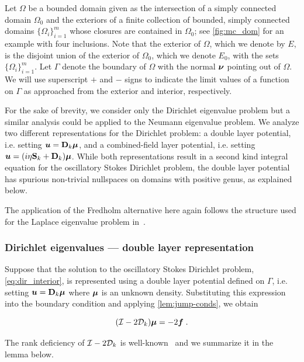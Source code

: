 Let $\Omega$ be a bounded domain given as
the intersection of a simply connected domain $\Omega_0$ and
the exteriors of a finite collection of bounded,
simply connected domains $\{ \Omega_i \}_{i=1}^m$
whose closures are contained in $\Omega_0$;
see \cref{fig:mc_dom} for an example with four inclusions.
Note that the
exterior of $\Omega$, which we denote by $E$, is the
disjoint union of the exterior of $\Omega_0$, which we
denote $E_0$, with the sets $\{ \Omega_i \}_{i=1}^m$.
Let $\Gamma$ denote the boundary of $\Omega$ with the normal
${\boldsymbol \nu}$ pointing out of $\Omega$.
We will use superscript $+$ and $-$ signs
to indicate the limit values of a function on $\Gamma$
as approached from the exterior and interior, respectively.

For the sake of brevity, we consider only the
Dirichlet eigenvalue problem but a similar analysis
could be applied to the Neumann eigenvalue problem.
We analyze two different representations for the
Dirichlet problem: a double layer potential,
i.e. setting ${\boldsymbol u}={\bf D}_{k} {\boldsymbol \mu}$, and a combined-field
layer potential, i.e. setting
${\boldsymbol u}=(i\eta {\bf S}_{k} + {\bf D}_{k}){\boldsymbol \mu}$. 
While both representations result in a second kind
integral equation for the oscillatory Stokes Dirichlet
problem, the double layer potential has spurious non-trivial
nullspaces on domains with positive genus, as
explained below.

\begin{remark}
  The application of the Fredholm alternative here
  again follows the structure used for the Laplace
  eigenvalue problem in~\cite[Ch. 3]{colton1983integral}.
\end{remark}


\subsubsection{Dirichlet eigenvalues --- double layer
  representation}
\label{subsec:dlanalysis}
Suppose that the solution to the oscillatory
Stokes Dirichlet problem, \cref{eq:dir_interior},
is represented using a double layer potential defined
on $\Gamma$, i.e. setting ${\boldsymbol u} = {\bf D}_{k} {\boldsymbol \mu}$ where
${\boldsymbol \mu}$ is an unknown density. 
Substituting this expression
into the boundary condition and applying
\cref{lem:jump-conds}, we obtain

\begin{equation}
  (\mathcal I - 2{\mathcal D}_{k}) {\boldsymbol \mu} = -2{\boldsymbol f} \; . \label{eq:inteq_dir_int}
\end{equation}

The rank deficiency of $\mathcal I-2{\mathcal D}_{k}$ is
well-known~\cite{biros2002embedded} and we summarize it
in the lemma below.

